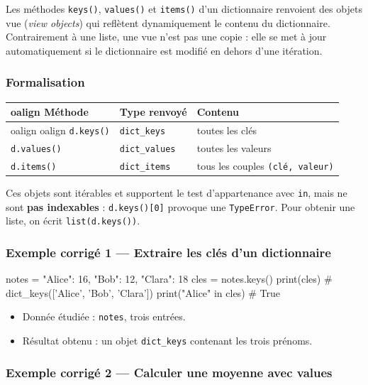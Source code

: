 Les méthodes \texttt{keys()}, \texttt{values()} et \texttt{items()} d'un
dictionnaire renvoient des objets vue (\emph{view objects}) qui
reflètent dynamiquement le contenu du dictionnaire. Contrairement à une
liste, une vue n'est pas une copie : elle se met à jour automatiquement
si le dictionnaire est modifié en dehors d'une itération.

\subsubsection{Formalisation}

\begin{longtable}[]{@{}lll@{}}
\toprule
oalign{}
Méthode & Type renvoyé & Contenu \\
\midrule
oalign{}
\endhead
\bottomrule
oalign{}
\endlastfoot
\texttt{d.keys()} & \texttt{dict\_keys} & toutes les clés \\
\texttt{d.values()} & \texttt{dict\_values} & toutes les valeurs \\
\texttt{d.items()} & \texttt{dict\_items} & tous les couples
\texttt{(clé,\ valeur)} \\
\end{longtable}

Ces objets sont itérables et supportent le test d'appartenance avec
\texttt{in}, mais ne sont \textbf{pas indexables} :
\texttt{d.keys(){[}0{]}} provoque une \texttt{TypeError}. Pour obtenir
une liste, on écrit \texttt{list(d.keys())}.

\subsubsection{Exemple corrigé 1 — Extraire les clés d’un dictionnaire}

\begin{python}
notes = {"Alice": 16, "Bob": 12, "Clara": 18}
cles = notes.keys()
print(cles)          # dict_keys(['Alice', 'Bob', 'Clara'])
print("Alice" in cles)  # True
\end{python}

\begin{itemize}
\tightlist
\item
  Donnée étudiée : \texttt{notes}, trois entrées.
\item
  Résultat obtenu : un objet \texttt{dict\_keys} contenant les trois
  prénoms.
\end{itemize}

\subsubsection{Exemple corrigé 2 — Calculer une moyenne avec values}

